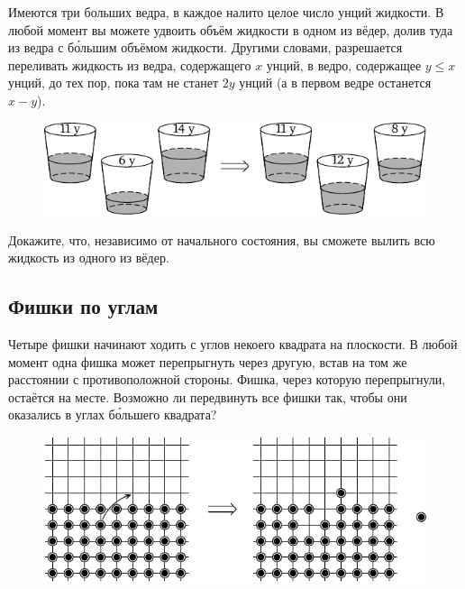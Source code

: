 \documentclass[twoside]{book}
\makeatletter
\newcommand{\rindex}[2][\imki@jobname]{%
  \index[#1]{\detokenize{#2}}%
}
\makeatother
\begin{document}
Имеются три больших ведра, в каждое налито целое число унций жидкости.
В любой момент вы можете удвоить объём жидкости в одном из вёдер, долив туда из ведра с б\'{о}льшим объёмом жидкости.
Другими словами, разрешается переливать жидкость из ведра, содержащего $x$ унций, в ведро, содержащее 
$y\le x$ унций, до тех пор, пока там не станет $2y$ унций (а в первом ведре останется $x-y$).

\begin{figure}[!ht]
\centering
\includegraphics{mp/wink-18}
\end{figure}

Докажите, что, независимо от начального состояния, вы сможете вылить всю жидкость из одного из вёдер.

\subsection*{Фишки по углам}%
\rindex{Фишки по углам}

Четыре фишки начинают ходить с углов некоего квадрата на плоскости.
В любой момент одна фишка может перепрыгнуть через другую,
встав на том же расстоянии с противоположной стороны.
Фишка, через которую перепрыгнули, остаётся на месте.
Возможно ли передвинуть все фишки так, чтобы они оказались в углах б\'{о}льшего квадрата?


\begin{figure}[b]
  \centering
\includegraphics{mp/wink-19}\hspace*{-4mm}
\end{figure}
\end{document}
